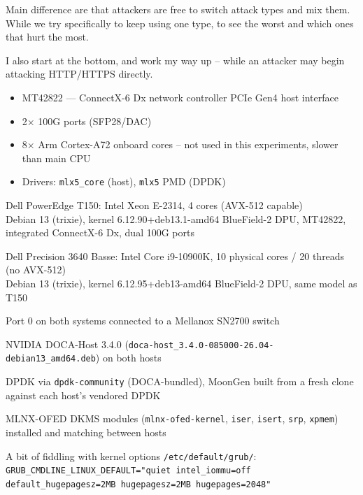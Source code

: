 \documentclass[Screen16to9,17pt]{foils}
\begin{document}
Main difference are that attackers are free to switch attack types and mix them. While we try specifically to keep using one type, to see the worst and which ones that hurt the most.

I also start at the bottom, and work my way up -- while an attacker may begin attacking HTTP/HTTPS directly.




\begin{itemize}
\item MT42822 — ConnectX-6 Dx network controller PCIe Gen4 host interface
\item 2× 100G ports (SFP28/DAC)
\item 8× Arm Cortex-A72 onboard cores -- not used in this experiments, slower than main CPU
\item Drivers: \verb+mlx5_core+ (host), \verb+mlx5+ PMD (DPDK)
 \end{itemize}



\begin{list2}
\item Dell PowerEdge T150: Intel Xeon E-2314, 4 cores (AVX-512 capable)\\
Debian 13 (trixie), kernel 6.12.90+deb13.1-amd64
BlueField-2 DPU, MT42822, integrated ConnectX-6 Dx, dual 100G ports\\
\item Dell Precision 3640 Basse: Intel Core i9-10900K, 10 physical cores / 20 threads (no AVX-512)\\
Debian 13 (trixie), kernel 6.12.95+deb13-amd64
BlueField-2 DPU, same model as T150\\
\item Port 0 on both systems connected to a Mellanox SN2700 switch
\end{list2}

\begin{list2}
\item NVIDIA DOCA-Host 3.4.0 (\verb+doca-host_3.4.0-085000-26.04-debian13_amd64.deb+) on both hosts
\item DPDK via \verb+dpdk-community+ (DOCA-bundled), MoonGen built from a fresh clone against each host's vendored DPDK
\item MLNX-OFED DKMS modules (\verb+mlnx-ofed-kernel+, \verb+iser+, \verb+isert+, \verb+srp+, \verb+xpmem+) installed and matching between hosts
\item A bit of fiddling with kernel options \verb+/etc/default/grub/+:\\
\verb+GRUB_CMDLINE_LINUX_DEFAULT="quiet intel_iommu=off default_hugepagesz=2MB hugepagesz=2MB hugepages=2048"+
\end{list2}
\end{document}
